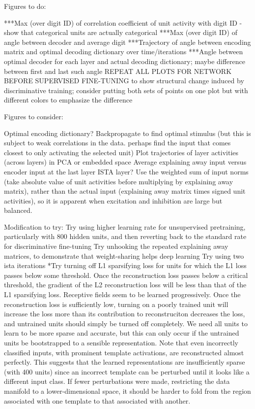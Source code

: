 Figures to do:


***Max (over digit ID) of correlation coefficient of unit activity with digit ID - show that categorical units are actually categorical
***Max (over digit ID) of angle between decoder and average digit
***Trajectory of angle between encoding matrix and optimal decoding dictionary over time/iterations
***Angle between optimal decoder for each layer and actual decoding dictionary; maybe difference between first and last such angle
REPEAT ALL PLOTS FOR NETWORK BEFORE SUPERVISED FINE-TUNING to show structural change induced by discriminative training; consider putting both sets of points on one plot but with different colors to emphasize the difference


Figures to consider:

Optimal encoding dictionary?
Backpropagate to find optimal stimulus (but this is subject to weak correlations in the data.  perhaps find the input that comes closest to only activating the selected unit)
Plot trajectories of layer activities (across layers) in PCA or embedded space
Average explaining away input versus encoder input at the last layer ISTA layer?  Use the weighted sum of input norms (take absolute value of unit activities before multiplying by explaining away matrix), rather than the actual input (explaining away matrix times signed unit activities), so it is apparent when excitation and inhibition are large but balanced.

Modification to try:
Try using higher learning rate for unsupervised pretraining, particularly with 800 hidden units, and then reverting back to the standard rate for discriminative fine-tuning
Try unhooking the repeated explaining away matrices, to demonstrate that weight-sharing helps deep learning
Try using two ista iterations
*Try turning off L1 sparsifying loss for units for which the L1 loss passes below some threshold.  Once the reconstruction loss passes below a critical threshold, the gradient of the L2 reconstruction loss will be less than that of the L1 sparsifying loss.  Receptive fields seem to be learned progressively.  Once the reconstruction loss is sufficiently low, turning on a poorly trained unit will increase the loss more than its contribution to reconstruciton decreases the loss, and untrained units should simply be turned off completely.  We need all units to learn to be more sparse and accurate, but this can only occur if the untrained units be bootstrapped to a sensible representation.  
Note that even incorrectly classified inputs, with prominent template activations, are reconstructed almost perfectly.  This suggests that the learned representations are insufficiently sparse (with 400 units) since an incorrect template can be perturbed until it looks like a different input class.  If fewer perturbations were made, restricting the data manifold to a lower-dimensional space, it should be harder to fold from the region associated with one template to that associated with another.


